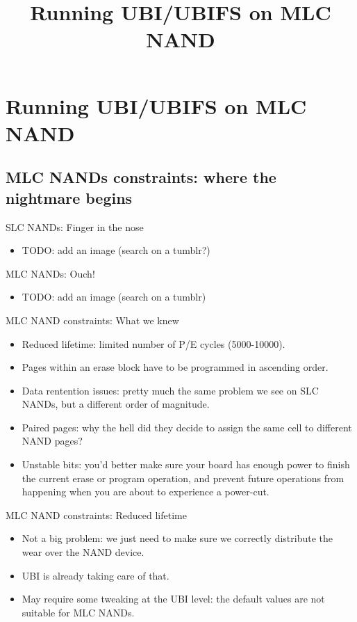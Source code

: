 \documentclass[aspectratio=169,obeyspaces,spaces,hyphens,dvipsnames]{beamer}
\title{Running UBI/UBIFS on MLC NAND}
\institute{Free Electrons}
\begin{document}
\section{Running UBI/UBIFS on MLC NAND}

\subsection{MLC NANDs constraints: where the nightmare begins}

\begin{frame}{SLC NANDs: Finger in the nose}
  \begin{itemize}
  \item TODO: add an image (search on a tumblr?)
  \end{itemize}
\end{frame}

\begin{frame}{MLC NANDs: Ouch!}
  \begin{itemize}
  \item TODO: add an image (search on a tumblr)
  \end{itemize}
\end{frame}

\begin{frame}{MLC NAND constraints: What we knew}
  \begin{itemize}
  \item Reduced lifetime: limited number of P/E cycles (5000-10000).
  \item Pages within an erase block have to be programmed in ascending
	order.
  \item Data rentention issues: pretty much the same problem we see
	on SLC NANDs, but a different order of magnitude.
  \item Paired pages: why the hell did they decide to assign the same
	cell to different NAND pages?
  \item Unstable bits: you'd better make sure your board has enough
	power to finish the current erase or program operation, and
	prevent future operations from happening when you are about to
	experience a power-cut.
  \end{itemize}
\end{frame}

\begin{frame}{MLC NAND constraints: Reduced lifetime}
  \begin{itemize}
  \item Not a big problem: we just need to make sure we correctly
	distribute the wear over the NAND device.
  \item UBI is already taking care of that.
  \item May require some tweaking at the UBI level: the default values
	are not suitable for MLC NANDs.
  \end{itemize}
\end{frame}
\end{document}
